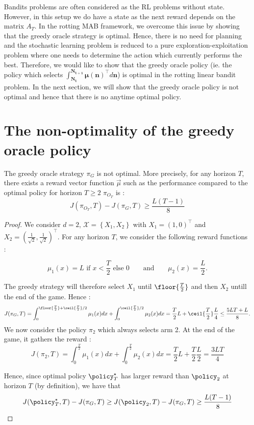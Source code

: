 Bandits problems are often considered as the RL problems without state. However, in this setup we do have a state as the next reward depends on the matrix $A_T$. In the  rotting MAB framework, we overcome this issue by showing that the greedy oracle strategy is optimal. Hence, there is no need for planning and the stochastic learning problem is reduced to a pure exploration-exploitation problem where one needs to determine the action which currently performs the best. Therefore, we would like to show that the greedy oracle policy (ie. the policy which selects $\int_{\bm{N_{t}}}^{\bm{N_{t+1}}} \bm{\mu}(\bm{n})^\intercal  d\bm{n}$) is optimal in the rotting linear bandit problem. In the next section, we will show that the greedy oracle policy is not optimal and hence that there is no anytime optimal policy. 

\section{The non-optimality of the greedy oracle policy }
\label{Optimal}
\begin{theorem}
The greedy oracle strategy $\pi_G$ is not optimal. More precisely, for any horizon $T$, there exists a reward vector function $\vec{\mu}$ such as the performance compared to the optimal policy for horizon $T \geq 2$ $\pi_{O_T}$ is :
\[
J(\pi_{O_T}, T) - J(\pi_G, T) \geq \frac{L(T-1)}{8}
\]
\end{theorem}
\begin{proof}
We consider $d = 2$, $\mathcal{X} = \left\{ X_1, X_2 \right\}$ with $X_1 = (1,0)^\intercal$ and $X_2 = (\frac{1}{\sqrt{2}},\frac{1}{\sqrt{2}})^\intercal$. For any horizon $T$, we consider the following reward functions :

\[\mu_1(x) = L \text{ if } x < \frac{T}{2} \text{ else } 0 \qquad \text{and} \qquad  \mu_2(x) = \frac{L}{2}.
\]

The greedy strategy will therefore select $X_1$ until $\floor{\frac{T}{2}}$ and then $X_2$ untill the end of the game. Hence  :
\[J(\pi_G, T) = \int_0^{\floor{\frac{T}{2}} + \ceil{\frac{T}{2}}/2} \mu_1(x)dx + \int_0^{\ceil{\frac{T}{2}}/2}  \mu_2(x)dx = \frac{T}{2}  L + \ceil{\frac{T}{2}} \frac{L}{4} \leq \frac{5LT + L }{8}.\]
We now consider the policy $\pi_2$ which always selects arm 2. At the end of the game, it gathers the reward : 
\[
J(\pi_2, T) = \int_0^{\frac{T}{2}} \mu_1(x)dx + \int_0^{\frac{T}{2}} \mu_2(x)dx = \frac{T}{2} L + \frac{T}{2} \frac{L}{2} = \frac{3LT}{4}
\]

Hence, since optimal policy $\policy_T^\star$ has larger reward than  $\policy_2$ at horizon $T$ (by definition), we have that 
\[
J(\policy_T^\star, T) - J(\pi_G, T) \geq J(\policy_2, T) - J(\pi_G, T) \geq \frac{L(T-1)}{8}
\]

\end{proof}

